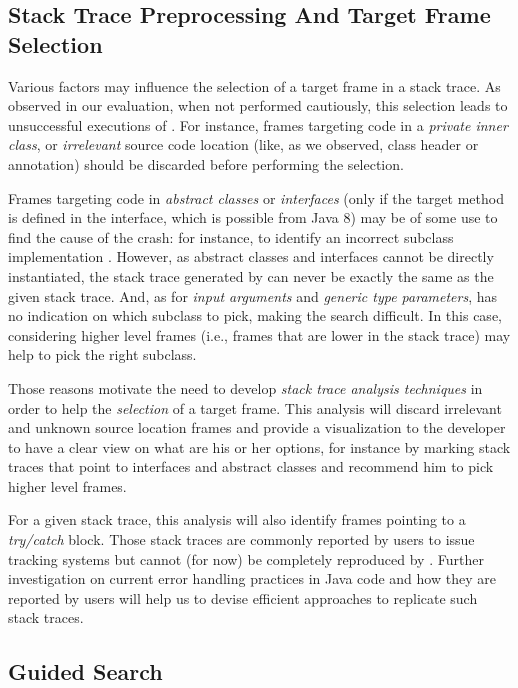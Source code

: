\subsection{Stack Trace Preprocessing And Target Frame Selection}

Various factors may influence the selection of a target frame in a stack trace.
As observed in our evaluation, when not performed cautiously, this selection leads to unsuccessful executions of \evocrash.
For instance, frames targeting code in a \emph{private inner class}, or \emph{irrelevant} source code location (like, as we observed, class header or annotation) should be discarded before performing the selection.

Frames targeting code in \emph{abstract classes} or \emph{interfaces} (only if the target method is defined in the interface, which is possible from Java 8) may be of some use to find the cause of the crash:  for instance, to identify an incorrect subclass implementation \cite{Liskov2000}.
However, as abstract classes and interfaces cannot be directly instantiated, the stack trace generated by \evocrash can never be exactly the same as the given stack trace.
And, as for \emph{input arguments} and \emph{generic type parameters}, \evocrash has no indication on which subclass to pick, making the search difficult.
In this case, considering higher level frames (i.e., frames that are lower in the stack trace) may help to pick the right subclass.

Those reasons motivate the need to develop \emph{stack trace analysis techniques} in order to help the \emph{selection} of a target frame.
This analysis will discard irrelevant and unknown source location frames and provide a visualization to the developer to have a clear view on what are his or her options, for instance by marking stack traces that point to interfaces and abstract classes and recommend him to pick higher level frames.

For a given stack trace, this analysis will also identify frames pointing to a \emph{try/catch} block.
Those stack traces are commonly reported by users to issue tracking systems but cannot (for now) be completely reproduced by \evocrash.
Further investigation on current error handling practices in Java code \cite{Cabral2007,Coelho2017} and how they are reported by users \cite{Maiga2015} will help us to devise efficient approaches to replicate such stack traces.

\subsection{Guided Search}


